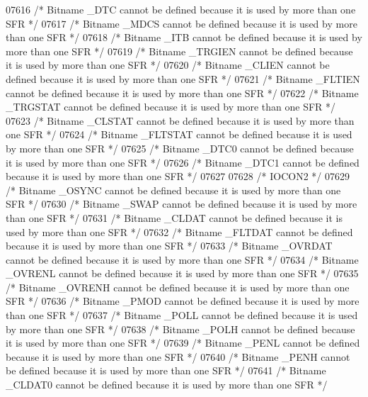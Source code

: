 \begin{DoxyCode}
07616 \textcolor{comment}{/* Bitname \_DTC cannot be defined because it is used by more than one SFR */}
07617 \textcolor{comment}{/* Bitname \_MDCS cannot be defined because it is used by more than one SFR */}
07618 \textcolor{comment}{/* Bitname \_ITB cannot be defined because it is used by more than one SFR */}
07619 \textcolor{comment}{/* Bitname \_TRGIEN cannot be defined because it is used by more than one SFR */}
07620 \textcolor{comment}{/* Bitname \_CLIEN cannot be defined because it is used by more than one SFR */}
07621 \textcolor{comment}{/* Bitname \_FLTIEN cannot be defined because it is used by more than one SFR */}
07622 \textcolor{comment}{/* Bitname \_TRGSTAT cannot be defined because it is used by more than one SFR */}
07623 \textcolor{comment}{/* Bitname \_CLSTAT cannot be defined because it is used by more than one SFR */}
07624 \textcolor{comment}{/* Bitname \_FLTSTAT cannot be defined because it is used by more than one SFR */}
07625 \textcolor{comment}{/* Bitname \_DTC0 cannot be defined because it is used by more than one SFR */}
07626 \textcolor{comment}{/* Bitname \_DTC1 cannot be defined because it is used by more than one SFR */}
07627 
07628 \textcolor{comment}{/* IOCON2 */}
07629 \textcolor{comment}{/* Bitname \_OSYNC cannot be defined because it is used by more than one SFR */}
07630 \textcolor{comment}{/* Bitname \_SWAP cannot be defined because it is used by more than one SFR */}
07631 \textcolor{comment}{/* Bitname \_CLDAT cannot be defined because it is used by more than one SFR */}
07632 \textcolor{comment}{/* Bitname \_FLTDAT cannot be defined because it is used by more than one SFR */}
07633 \textcolor{comment}{/* Bitname \_OVRDAT cannot be defined because it is used by more than one SFR */}
07634 \textcolor{comment}{/* Bitname \_OVRENL cannot be defined because it is used by more than one SFR */}
07635 \textcolor{comment}{/* Bitname \_OVRENH cannot be defined because it is used by more than one SFR */}
07636 \textcolor{comment}{/* Bitname \_PMOD cannot be defined because it is used by more than one SFR */}
07637 \textcolor{comment}{/* Bitname \_POLL cannot be defined because it is used by more than one SFR */}
07638 \textcolor{comment}{/* Bitname \_POLH cannot be defined because it is used by more than one SFR */}
07639 \textcolor{comment}{/* Bitname \_PENL cannot be defined because it is used by more than one SFR */}
07640 \textcolor{comment}{/* Bitname \_PENH cannot be defined because it is used by more than one SFR */}
07641 \textcolor{comment}{/* Bitname \_CLDAT0 cannot be defined because it is used by more than one SFR */}

\end{DoxyCode}
